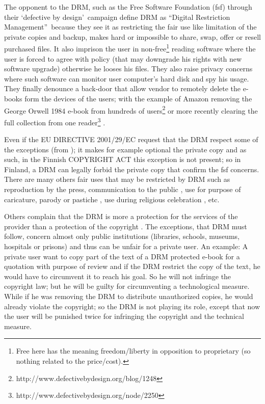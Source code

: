 \documentclass[11pt,a4paper,oneside]{memoir}
\begin{document}
The opponent to the DRM, such as the Free Software Foundation (fsf) through their \textquoteleft defective by design\textquoteright ~campaign define DRM as \textquotedblleft Digital Restriction Management\textquotedblright ~because they see it as restricting the fair use like limitation of the private copies and backup, makes hard or impossible to share, swap, offer or resell purchased files.
It also imprison the user in non-free\footnote{Free here has the meaning freedom/liberty in opposition to proprietary (so nothing related to the price/cost).} reading software where the user is forced to agree with policy (that may downgrade his rights with new software upgrade) otherwise he looses his files. They also raise privacy concerns where such software can monitor user computer's hard disk and spy his usage. They finally denounce a back-door that allow vendor to remotely delete the e-books form the devices of the users; with the example of Amazon removing the George Orwell 1984 e-book from hundreds of users\footnote{http://www.defectivebydesign.org/blog/1248} or more recently clearing the full collection from one reader\footnote{http://www.defectivebydesign.org/node/2250} \cite{fsf:defectivebydesign}.

Even if the EU DIRECTIVE 2001/29/EC \cite[article 6(4)]{eur-lex:2001/29/EC} request that the DRM respect some of the exceptions (from \cite[article 5]{eur-lex:2001/29/EC}); it makes for example optional the private copy and as such, in the Finnish COPYRIGHT ACT \cite[section 50c(1)]{finlex:copyright_act} this exception is not present; so in Finland, a DRM can legally forbid the private copy that confirm the fsf concerns. There are many others fair uses that may be restricted by DRM such as reproduction by the press, communication to the public \cite[article 5(3)(c)]{eur-lex:2001/29/EC}, use for purpose of caricature, parody or pastiche \cite[article 5(3)(k)]{eur-lex:2001/29/EC}, use during religious celebration \cite[article 5(3)(g)]{eur-lex:2001/29/EC}, etc.

Others complain that the DRM is more a protection for the services of the provider than a protection of the copyright \cite[chapter 7]{droit-technologie:internet_copyright}. The exceptions, that DRM must follow, concern almost only public institutions (libraries, schools, museums, hospitals or prisons) and thus can be unfair for a private user. An example: A private user want to copy part of the text of a DRM protected e-book for a quotation with purpose of review \cite[article 5(3)(d)]{eur-lex:2001/29/EC} and if the DRM restrict the copy of the text, he would have to circumvent it to reach his goal. So he will not infringe the copyright law; but he will be guilty for circumventing a technological measure. While if he was removing the DRM to distribute unauthorized copies, he would already violate the copyright; so the DRM is not playing its role, except that now the user will be punished twice for infringing the copyright and the technical measure.
\end{document}

